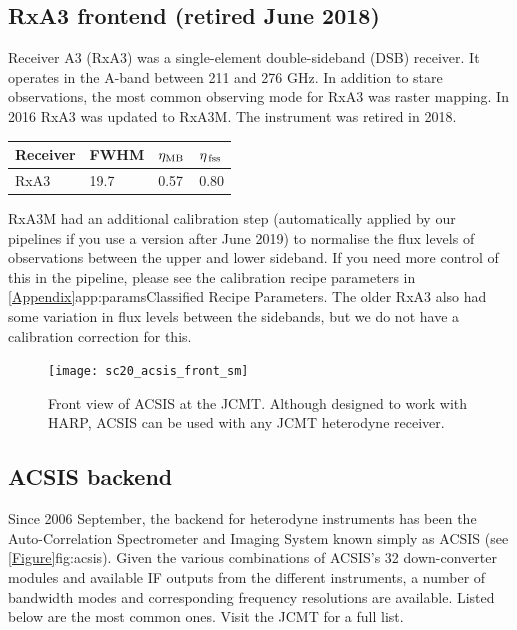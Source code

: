 \documentclass[11pt,oneside,chapters]{starlink}
\newcommand{\uarcs}{\hspace{-0.27em}\arcsec\hspace{-0.07em}}
\newcommand{\uarcs}{$''$}
\begin{document}
\subsection{RxA3 frontend (retired June 2018)}

Receiver A3 (RxA3) was a single-element double-sideband (DSB) receiver. It
operates in the A-band between 211 and 276 GHz. In addition to stare
observations, the most common observing mode for RxA3 was raster
mapping. In 2016 RxA3 was updated to RxA3M. The instrument was retired in 2018.

\begin{table}[h!]
\begin{center}
\begin{tabular}{|p{1.5cm}|p{1.2cm}|p{0.8cm}|p{0.8cm}|}
\hline
Receiver &FWHM & $\eta_{\textnormal{MB}}$ & $\eta_{\textnormal{\,fss}}$\\
\hline
RxA3&19.\uarcs7&0.57 & 0.80\\
\hline
\end{tabular}
\end{center}
\end{table}

RxA3M had an additional calibration step (automatically applied by our
pipelines if you use a version after June 2019) to normalise the flux
levels of observations between the upper and lower sideband. If you
need more control of this in the pipeline, please see the calibration
recipe parameters in \cref{Appendix}{app:params}{Classified Recipe
Parameters}.  The older RxA3 also had some variation in flux levels
between the sidebands, but we do not have a calibration correction for
this.


\begin{figure}[b!]
\begin{center}
\texttt{[image: sc20\_acsis\_front\_sm]}
\caption[Front view of ACSIS at the JCMT]{\label{fig:acsis}
  Front view of ACSIS at the JCMT. Although designed to work with HARP,
  ACSIS can be used with any JCMT heterodyne receiver.}
\end{center}
\end{figure}


\subsection{ACSIS backend}

Since 2006 September, the backend for heterodyne instruments has been the
Auto-Correlation Spectrometer and Imaging System known simply as ACSIS
(see \cref{Figure}{fig:acsis}{}). Given the various combinations of
ACSIS's 32 down-converter modules and available IF outputs from the
different instruments, a number of bandwidth modes and corresponding
frequency resolutions are available. Listed below are the most common
ones. Visit the JCMT  for a full list.
\end{document}
